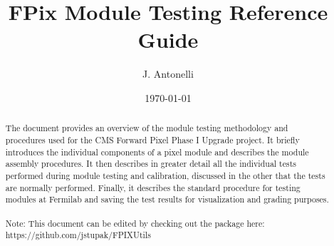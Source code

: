 \documentclass{scrartcl}
\title{FPix Module Testing Reference Guide} %
\author{
J. Antonelli
} %
\date{\today} %
\begin{document}
\maketitle %


\begin{abstract}
The document provides an overview of the module testing methodology and procedures used for the CMS Forward Pixel Phase I Upgrade project. 
It briefly introduces the individual components of a pixel module and describes the module assembly procedures.
It then describes in greater detail all the individual tests performed during module testing and calibration, discussed in the other that the tests are normally performed. 
Finally, it describes the standard procedure for testing modules at Fermilab and saving the test results for visualization and grading purposes.
\\\\
Note: This document can be edited by checking out the package here: 
\\
https://github.com/jstupak/FPIXUtils
\end{abstract}

\newpage
\tableofcontents

\newpage









%  
\end{document}
